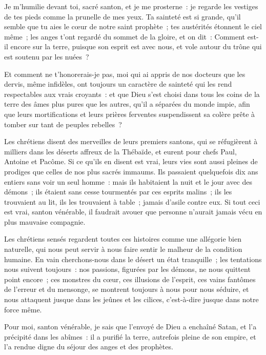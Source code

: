 \documentclass[french,twoside]{book} %
\begin{document}
\noindent Je m’humilie devant toi, sacré santon, et je me prosterne : je regarde les vestiges de tes pieds comme la prunelle de mes yeux. Ta sainteté est si grande, qu’il semble que tu aies le cœur de notre saint prophète ; tes austérités étonnent le ciel même ; les anges t’ont regardé du sommet de la gloire, et on dit : Comment est-il encore sur la terre, puisque son esprit est avec nous, et vole autour du trône qui est soutenu par les nuées ?\par
Et comment ne t’honorerais-je pas, moi qui ai appris de nos docteurs que les dervis, même infidèles, ont toujours un caractère de sainteté qui les rend respectables aux vrais croyants : et que Dieu s’est choisi dans tous les coins de la terre des âmes plus pures que les autres, qu’il a séparées du monde impie, afin que leurs mortifications et leurs prières ferventes suspendissent sa colère prête à tomber sur tant de peuples rebelles ?\par
Les chrétiens disent des merveilles de leurs premiers santons, qui se réfugièrent à milliers dans les déserts affreux de la Thébaïde, et eurent pour chefs Paul, Antoine et Pacôme. Si ce qu’ils en disent est vrai, leurs vies sont aussi pleines de prodiges que celles de nos plus sacrés immaums. Ils passaient quelquefois dix ans entiers sans voir un seul homme : mais ils habitaient la nuit et le jour avec des démons ; ils étaient sans cesse tourmentés par ces esprits malins ; ils les trouvaient au lit, ils les trouvaient à table ; jamais d’asile contre eux. Si tout ceci est vrai, santon vénérable, il faudrait avouer que personne n’aurait jamais vécu en plus mauvaise compagnie.\par
Les chrétiens sensés regardent toutes ces histoires comme une allégorie bien naturelle, qui nous peut servir à nous faire sentir le malheur de la condition humaine. En vain cherchons-nous dans le désert un état tranquille ; les tentations nous suivent toujours : nos passions, figurées par les démons, ne nous quittent point encore ; ces monstres du cœur, ces illusions de l’esprit, ces vains fantômes de l’erreur et du mensonge, se montrent toujours à nous pour nous séduire, et nous attaquent jusque dans les jeûnes et les cilices, c’est-à-dire jusque dans notre force même.\par
Pour moi, santon vénérable, je sais que l’envoyé de Dieu a enchaîné Satan, et l’a précipité dans les abîmes : il a purifié la terre, autrefois pleine de son empire, et l’a rendue digne du séjour des anges et des prophètes.\par
\end{document}
